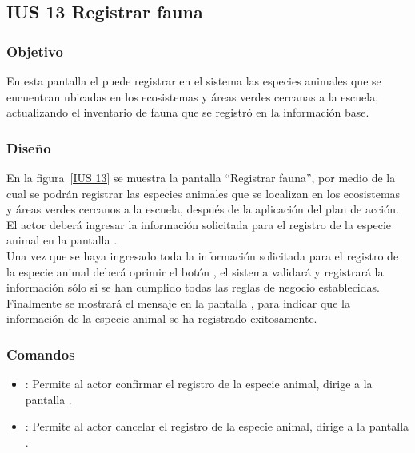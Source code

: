 \subsection{IUS 13 Registrar fauna}

\subsubsection{Objetivo}

En esta pantalla el  puede registrar en el sistema las especies animales que se encuentran ubicadas en los ecosistemas y áreas verdes cercanas a la escuela, actualizando el inventario de fauna que se registró en la información base.

\subsubsection{Diseño}

    En la figura~\ref{IUS 13} se muestra la pantalla ``Registrar fauna'', por medio de la cual se podrán registrar las especies animales que se localizan en los ecosistemas y áreas verdes cercanos a la escuela, después de la aplicación del plan de acción. El actor deberá ingresar la información solicitada para el registro de la especie animal en la pantalla .\\
        
    Una vez que se haya ingresado toda la información solicitada para el registro de la especie animal deberá oprimir el botón , el sistema validará y registrará la información sólo si se han cumplido todas las reglas de negocio establecidas.\\
    
    Finalmente se mostrará el mensaje  en la pantalla , para indicar que la información de la especie animal se ha registrado exitosamente.
      

\subsubsection{Comandos}
    \begin{itemize}
    \item {}: Permite al actor confirmar el registro de la especie animal, dirige a la pantalla .
    \item {}: Permite al actor cancelar el registro de la especie animal, dirige a la pantalla .
    \end{itemize}

